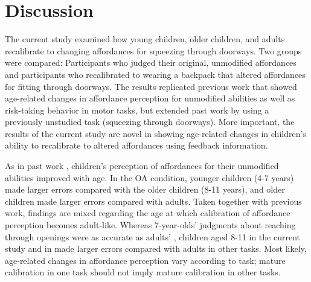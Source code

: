 \documentclass[a4paper,man,natbib,floatsintext,noextraspace]{apa6}
\begin{document}
\section{Discussion}

The current study examined how young children, older children, and adults recalibrate to changing affordances for squeezing through doorways. Two groups were compared: Participants who judged their original, unmodified affordances and participants who recalibrated to wearing a backpack that altered affordances for fitting through doorways. The results replicated previous work that showed age-related changes in affordance perception for unmodified abilities as well as risk-taking behavior in motor tasks, but extended past work by using a previously unstudied task (squeezing through doorways). More important, the results of the current study are novel in showing age-related changes in children's ability to recalibrate to altered affordances using feedback information.

As in past work \citep{Plumert95,ChildReaching,KlevbergAnderson}, children's perception of affordances for their unmodified abilities improved with age. In the OA condition, younger children (4-7 years) made larger errors compared with the older children (8-11 years), and older children made larger errors compared with adults. Taken together with previous work, findings are mixed regarding the age at which calibration of affordance perception becomes adult-like. Whereas 7-year-olds' judgments about reaching through openings were as accurate as adults' \citep{ChildReaching}, children aged 8-11 in the current study and in \cite{Plumert95} made larger errors compared with adults in other tasks. Most likely, age-related changes in affordance perception vary according to task; mature calibration in one task should not imply mature calibration in other tasks. 
\end{document}
